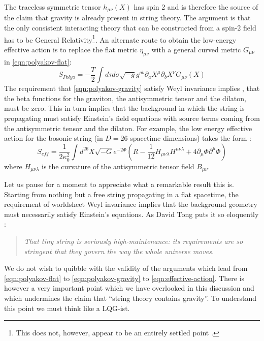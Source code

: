 \documentclass[submission, Phys]{SciPost}
\begin{document}
The traceless symmetric tensor $ h_{\mu\nu}(X) $ has spin 2 and is therefore the source of the claim that gravity is already present in string theory. The argument \cite{Boulware1975Classical} is that the only consistent interacting theory that can be constructed from a spin-2 field has to be General Relativity\footnote{This does not, however, appear to be an entirely settled point \cite{Padmanabhan2004From,Deser2009Gravity}.}. An alternate route to obtain the low-energy effective action is to replace the flat metric $ \eta_{\mu\nu} $ with a general curved metric $ G_{\mu\nu} $ in \eqref{eqn:polyakov-flat}:
\begin{equation}\label{eqn:polyakov-gravity}
		S_{Polya} = -\frac{T}{2} \int d\tau d\sigma \sqrt{-g} g^{ab} \partial_a X^\mu \partial_b X^\nu G_{\mu\nu}(X)
\end{equation}
The requirement that \eqref{eqn:polyakov-gravity} satisfy Weyl invariance implies \cite[Sec 3.7]{Polchinski1998aString}, \cite[Sec 7.2]{Tong2010Lectures} that the beta functions for the graviton, the antisymmetric tensor and the dilaton, must be zero. This in turn implies that the background in which the string is propagating must satisfy Einstein's field equations with source terms coming from the antisymmetric tensor and the dilaton. For example, the low energy effective action for the bosonic string (in $ D=26 $ spacetime dimensions) takes the form \cite{Tong2010Lectures}:
\begin{equation}\label{eqn:effective-action}
	S_{eff} = \frac{1}{2 \kappa^2_0} \int d^{26} X \sqrt{-G} e^{-2\Phi} \left( R - \frac{1}{12} H_{\mu\nu\lambda}H^{\mu\nu\lambda} + 4 \partial_\mu \Phi \partial^\mu \Phi \right)
\end{equation}
where $ H_{\mu\nu\lambda} $ is the curvature of the antisymmetric tensor field $ B_{\mu\nu} $.

Let us pause for a moment to appreciate what a remarkable result this is. Starting from nothing but a free string propagating in a flat spacetime, the requirement of worldsheet Weyl invariance implies that the background geometry must necessarily satisfy Einstein's equations. As David Tong puts it so eloquently \cite[pg. 175]{Tong2010Lectures}:
\begin{quote}
	\emph{That tiny string is seriously high-maintenance: its requirements are so stringent that they govern the way the whole universe moves.}
\end{quote}
We do not wish to quibble with the validity of the arguments which lead from \eqref{eqn:polyakov-flat} to \eqref{eqn:polyakov-gravity} to \eqref{eqn:effective-action}. There is however a very important point which we have overlooked in this discussion and which undermines the claim that ``string theory contains gravity''. To understand this point we must think like a LQG-ist.
\end{document}

